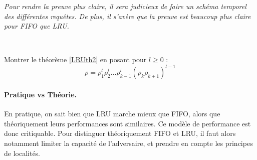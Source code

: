 \begin{center}
\textit{ Pour rendre la preuve plus claire, il sera judicieux de faire un schéma temporel des différentes requêtes. De plus, il s'avère que la preuve est beaucoup plus claire pour FIFO que LRU.}
\end{center}

\begin{exercise}~

\noindent Montrer le théorème \ref{LRUth2} en posant pour $l\geq 0$ :
$$
\rho = \rho_1^l \rho_2^l ... \rho_{k-1}^l (\rho_k \rho_{k+1})^{l-1}
$$
\end{exercise}


\paragraph{Pratique vs Théorie.} En pratique, on sait bien que LRU marche mieux que FIFO, alors que théoriquement leurs performances sont similaires. Ce modèle de performance est donc critiquable. Pour distinguer théoriquement FIFO et LRU, il faut alors notamment limiter la capacité de l'adversaire, et prendre en compte les principes de localités.
